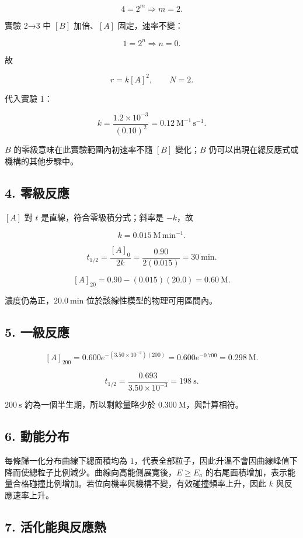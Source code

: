 \documentclass[11pt,a4paper]{article}
\begin{document}
\[
4=2^m\Rightarrow m=2.
\]

實驗 2→3 中 \([B]\) 加倍、\([A]\) 固定，速率不變：

\[
1=2^n\Rightarrow n=0.
\]

故

\[
r=k[A]^2,
\qquad N=2.
\]

代入實驗 1：

\[
k=\frac{1.2\times10^{-3}}{(0.10)^2}
=0.12\ \mathrm{M^{-1}\,s^{-1}}.
\]

\(B\) 的零級意味在此實驗範圍內初速率不隨 \([B]\) 變化；\(B\) 仍可以出現在總反應式或機構的其他步驟中。

\subsection{4. 零級反應}\label{ux96f6ux7d1aux53cdux61c9}

\([A]\) 對 \(t\) 是直線，符合零級積分式；斜率是 \(-k\)，故

\[
k=0.015\ \mathrm{M\,min^{-1}}.
\]

\[
t_{1/2}=\frac{[A]_0}{2k}
=\frac{0.90}{2(0.015)}
=30\ \mathrm{min}.
\]

\[
[A]_{20}=0.90-(0.015)(20.0)
=0.60\ \mathrm M.
\]

濃度仍為正，\(20.0\ \mathrm{min}\) 位於該線性模型的物理可用區間內。

\subsection{5. 一級反應}\label{ux4e00ux7d1aux53cdux61c9}

\[
[A]_{200}=0.600e^{-(3.50\times10^{-3})(200)}
=0.600e^{-0.700}
=0.298\ \mathrm M.
\]

\[
t_{1/2}=\frac{0.693}{3.50\times10^{-3}}
=198\ \mathrm s.
\]

\(200\ \mathrm s\) 約為一個半生期，所以剩餘量略少於 \(0.300\ \mathrm M\)，與計算相符。

\subsection{6. 動能分布}\label{ux52d5ux80fdux5206ux5e03}

每條歸一化分布曲線下總面積均為 \(1\)，代表全部粒子，因此升溫不會因曲線峰值下降而使總粒子比例減少。曲線向高能側展寬後，\(E\ge E_a\) 的右尾面積增加，表示能量合格碰撞比例增加。若位向機率與機構不變，有效碰撞頻率上升，因此 \(k\) 與反應速率上升。

\subsection{7. 活化能與反應熱}\label{ux6d3bux5316ux80fdux8207ux53cdux61c9ux71b1}
\end{document}
